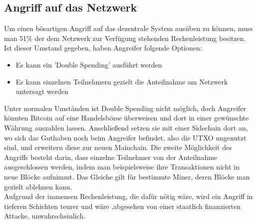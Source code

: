 \subsection{Angriff auf das Netzwerk}
Um einen bösartigen Angriff auf das dezentrale System ausüben zu können, muss man 51\% der dem Netzwerk zur Verfügung stehenden Rechenleistung besitzen. Ist dieser Umstand gegeben, haben Angreifer folgende Optionen:
\begin{itemize}
	\item Es kann ein 'Double Spending' ausführt werden
	\item Es kann einzelnen Teilnehmern gezielt die Anteilnahme am Netzwerk untersagt werden
\end{itemize}
Unter normalen Umständen ist Double Spending nicht möglich, doch Angreifer könnten Bitcoin auf eine Handelsbörse überweisen und dort in einer gewünschte Währung auszahlen lassen. Anschließend setzen sie mit einer Sidechain dort an, wo sich das Guthaben noch beim Angreifer befindet, also die UTXO ungenutzt sind, und erweitern diese zur neuen Mainchain.
Die zweite Möglichkeit des Angriffs besteht darin, dass einzelne Teilnehmer von der Anteilnahme ausgeschlossen werden, indem man beispielsweise ihre Transaktionen nicht in neue Blöcke aufnimmt. Das Gleiche gilt für bestimmte Miner, deren Blöcke man gezielt ablehnen kann.\\
Aufgrund der immensen Rechenleistung, die dafür nötig wäre, wird ein Angriff in tieferen Schichten teurer und wäre ,abgesehen von einer staatlich finanzierten Attacke, unwahrscheinlich.